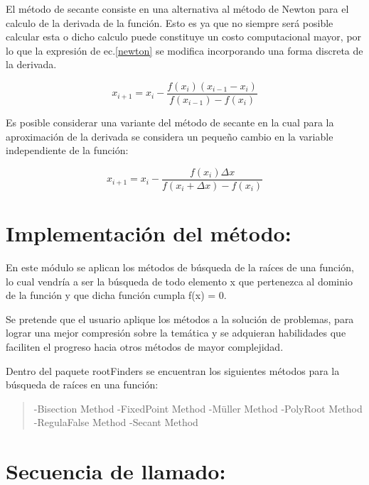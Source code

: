 \documentclass[letterpaper,10pt,oneside]{sphinxmanual}
\theoremstyle{plain}%
\theoremstyle{definition}%
\theoremstyle{remark}%
\begin{document}
\noindent El método de secante consiste en una alternativa al método de Newton para el calculo de la derivada de la función. Esto es ya que no siempre será posible calcular esta o dicho calculo puede constituye un costo computacional mayor, por lo que la expresión de ec.\ref{newton} se modifica incorporando una forma discreta de la derivada.\medskip

\begin{equation}
 x_{i+1}=x_{i}-\frac{f(x_{i})(x_{i-1}-x_{i})}{f(x_{i-1})-f(x_{i})} \label{secante}
\end{equation}

\noindent Es posible considerar una variante del método de secante en la cual para la aproximación de la derivada se considera un pequeño cambio en la variable independiente de la función:\medskip

\begin{equation}
x_{i+1}=x_{i}-\frac{f(x_{i})\Delta x}{f(x_{i}+\Delta x)-f(x_{i})} \label{secantem}
\end{equation}

\label{chapter01::doc}\label{chapter01:bienvenido-a-la-documentacion-de-numericos-interactivos}\label{chapter01:capitulo-01-busqueda-de-raices}

\section{Implementación del método:}

\label{chapter01:descripcion-del-metodo}

\noindent En este módulo se aplican los métodos de búsqueda de la raíces de una función, lo cual vendría a ser la búsqueda de todo elemento x que pertenezca al dominio de la función y que dicha función  cumpla f(x) = 0.\medskip

\noindent Se pretende que el usuario aplique los métodos a la solución de problemas, para lograr una mejor compresión sobre la temática y se adquieran habilidades que faciliten el progreso hacia otros métodos de mayor complejidad.\medskip

Dentro del paquete rootFinders se encuentran los siguientes métodos para la búsqueda de raíces en una función:
\begin{quote}

-Bisection Method
-FixedPoint Method
-Müller Method
-PolyRoot Method
-RegulaFalse Method
-Secant Method
\end{quote}

\section{Secuencia de llamado:}
\end{document}
